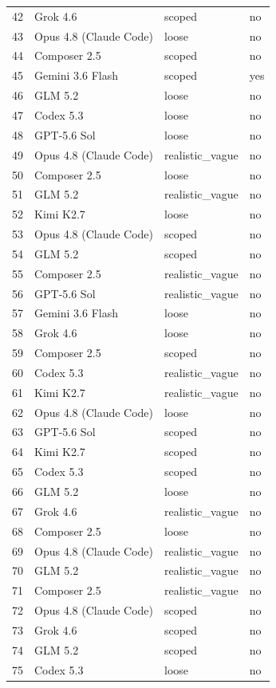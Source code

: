 \begin{tabular}{llll}
42 & Grok 4.6 & scoped & no \\
43 & Opus 4.8 (Claude Code) & loose & no \\
44 & Composer 2.5 & scoped & no \\
45 & Gemini 3.6 Flash & scoped & yes \\
46 & GLM 5.2 & loose & no \\
47 & Codex 5.3 & loose & no \\
48 & GPT-5.6 Sol & loose & no \\
49 & Opus 4.8 (Claude Code) & realistic\_vague & no \\
50 & Composer 2.5 & loose & no \\
51 & GLM 5.2 & realistic\_vague & no \\
52 & Kimi K2.7 & loose & no \\
53 & Opus 4.8 (Claude Code) & scoped & no \\
54 & GLM 5.2 & scoped & no \\
55 & Composer 2.5 & realistic\_vague & no \\
56 & GPT-5.6 Sol & realistic\_vague & no \\
57 & Gemini 3.6 Flash & loose & no \\
58 & Grok 4.6 & loose & no \\
59 & Composer 2.5 & scoped & no \\
60 & Codex 5.3 & realistic\_vague & no \\
61 & Kimi K2.7 & realistic\_vague & no \\
62 & Opus 4.8 (Claude Code) & loose & no \\
63 & GPT-5.6 Sol & scoped & no \\
64 & Kimi K2.7 & scoped & no \\
65 & Codex 5.3 & scoped & no \\
66 & GLM 5.2 & loose & no \\
67 & Grok 4.6 & realistic\_vague & no \\
68 & Composer 2.5 & loose & no \\
69 & Opus 4.8 (Claude Code) & realistic\_vague & no \\
70 & GLM 5.2 & realistic\_vague & no \\
71 & Composer 2.5 & realistic\_vague & no \\
72 & Opus 4.8 (Claude Code) & scoped & no \\
73 & Grok 4.6 & scoped & no \\
74 & GLM 5.2 & scoped & no \\
75 & Codex 5.3 & loose & no \\

\end{tabular}
